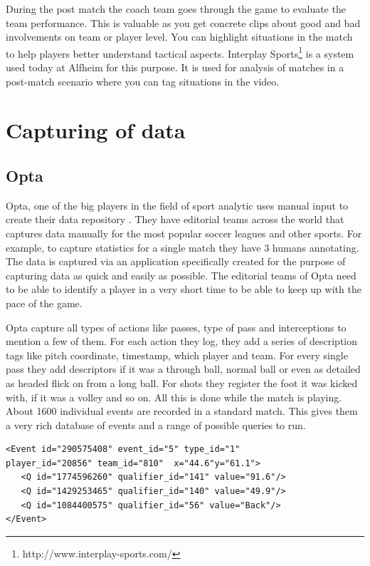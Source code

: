 During the post match the coach team goes through the game to evaluate the team performance. This is valuable as you get concrete clips about good and bad involvements on team or player level. You can highlight situations in the match to help players better understand tactical aspects. Interplay Sports\footnote{ http://www.interplay-sports.com/} is a system used today at Alfheim for this purpose. It is used for analysis of matches in a post-match scenario where you can tag situations in the video. 

\section{Capturing of data}
\subsection{Opta}

Opta, one of the big players in the field of sport analytic uses manual input to create their data repository \cite{dailymailOnStatistics}. They have editorial teams across the world that captures data manually for the most popular soccer leagues and other sports. For example, to capture statistics for a single match they have 3 humans annotating. The data is captured via an application specifically created for the purpose of capturing data as quick and easily as possible. The editorial teams of Opta need to be able to identify a player in a very short time to be able to keep up with the pace of the game. 

Opta capture all types of actions like passes, type of pass and interceptions to mention a few of them. For each action they log, they add a series of description tags like pitch coordinate, timestamp, which player and team. For every single pass they add descriptors if it was a through ball, normal ball or even as detailed as headed flick on from a long ball. For shots they register the foot it was kicked with, if it was a volley and so on. All this is done while the match is playing. About 1600 individual events are recorded in a standard match. This gives them a very rich database of events and a range of possible queries to run. 

\begin{lstlisting}
<Event id="290575408" event_id="5" type_id="1" 
player_id="20856" team_id="810"  x="44.6"y="61.1">
   <Q id="1774596260" qualifier_id="141" value="91.6"/>
   <Q id="1429253465" qualifier_id="140" value="49.9"/>
   <Q id="1084400575" qualifier_id="56" value="Back"/>
</Event>
\end{lstlisting}


